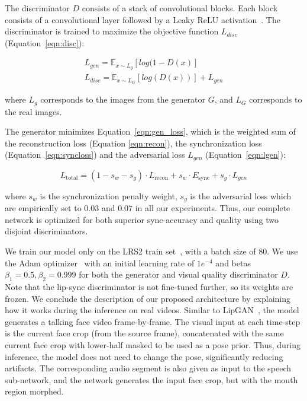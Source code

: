 \documentclass[sigconf]{acmart}
\begin{document}
The discriminator $D$ consists of a stack of convolutional blocks. Each block consists of a convolutional layer followed by a Leaky ReLU activation~\cite{maas2013rectifier}. The discriminator is trained to maximize the objective function $L_{disc}$ (Equation~\ref{eqn:disc}):

\begin{align}
    L_{gen} = \mathbb{E}_{x\sim L_{g}}[log(1 - D(x)]\label{eqn:lgen}\\
    L_{disc} = \mathbb{E}_{x\sim L_{G}}[log(D(x))] + L_{gen}
    \label{eqn:disc}
\end{align}

where $L_{g}$ corresponds to the images from the generator $G$, and $L_{G}$ corresponds to the real images.

The generator minimizes Equation~\ref{eqn:gen_loss}, which is the weighted sum of the reconstruction loss (Equation \ref{eqn:recon}), the synchronization loss (Equation~\ref{eqn:syncloss}) and the adversarial loss $L_{gen}$ (Equation~\ref{eqn:lgen}):

\begin{equation}
    L_{\mathrm{total}} = (1 - s_w - s_g) \cdot L_{\mathrm{recon}} + s_w \cdot E_\mathrm{sync} + s_g \cdot L_{gen}
    \label{eqn:gen_loss}
\end{equation}

where $s_w$ is the synchronization penalty weight, $s_g$ is the adversarial loss which are empirically set to $0.03$ and $0.07$ in all our experiments. Thus, our complete network is optimized for both superior sync-accuracy and quality using two disjoint discriminators.  

We train our model only on the LRS2 train set~\cite{Afouras18c}, with a batch size of $80$. We use the Adam optimizer~\cite{duchi2011adaptive} with an initial learning rate of $1e^{-4}$ and betas $\beta_1 = 0.5, \beta_2 = 0.999$ for both the generator and visual quality discriminator $D$. Note that the lip-sync discriminator is not fine-tuned further, so its weights are frozen. We conclude the description of our proposed architecture by explaining how it works during the inference on real videos. Similar to LipGAN~\cite{kr2019towards}, the model generates a talking face video frame-by-frame. The visual input at each time-step is the current face crop (from the source frame), concatenated with the same current face crop with lower-half masked to be used as a pose prior. Thus, during inference, the model does not need to change the pose, significantly reducing artifacts. The corresponding audio segment is also given as input to the speech sub-network, and the network generates the input face crop, but with the mouth region morphed. 
\end{document}

